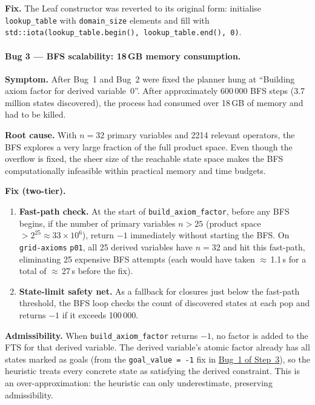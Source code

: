 \documentclass[11pt,a4paper]{article}
\begin{document}
\begin{itemize}
    \textbf{Fix.}  The Leaf constructor was reverted to its original form:
    initialise \texttt{lookup\_table} with \texttt{domain\_size} elements and
    fill with \texttt{std::iota(lookup\_table.begin(), lookup\_table.end(), 0)}.

    \paragraph{Bug 3 --- BFS scalability: 18\,GB memory consumption.}
    \textbf{Symptom.}  After Bug~1 and Bug~2 were fixed the planner hung at
    ``Building axiom factor for derived variable~0''.  After approximately
    600\,000 BFS steps (3.7 million states discovered), the process had
    consumed over 18\,GB of memory and had to be killed.

    \textbf{Root cause.}  With $n = 32$ primary variables and 2214 relevant
    operators, the BFS explores a very large fraction of the full product space.
    Even though the overflow is fixed, the sheer size of the reachable state
    space makes the BFS computationally infeasible within practical memory and
    time budgets.

    \textbf{Fix (two-tier).}
    \begin{enumerate}
      \item \textbf{Fast-path check.}  At the start of
        \texttt{build\_axiom\_factor}, before any BFS begins, if the number
        of primary variables $n > 25$ (product space $> 2^{25} \approx
        33 \times 10^6$), return $-1$ immediately without starting the BFS.
        On \texttt{grid-axioms} \texttt{p01}, all 25 derived variables have
        $n = 32$ and hit this fast-path, eliminating 25 expensive BFS attempts
        (each would have taken $\approx$\,1.1\,s for a total of $\approx$\,27\,s
        before the fix).
      \item \textbf{State-limit safety net.}  As a fallback for closures just
        below the fast-path threshold, the BFS loop checks the count of
        discovered states at each pop and returns $-1$ if it exceeds 100\,000.
    \end{enumerate}

    \textbf{Admissibility.}  When \texttt{build\_axiom\_factor} returns $-1$,
    no factor is added to the FTS for that derived variable.  The derived
    variable's atomic factor already has all states marked as goals (from the
    \texttt{goal\_value = -1} fix in \hyperlink{par:step3-bug1}{Bug~1 of Step~3}), so the heuristic treats
    every concrete state as satisfying the derived constraint.  This is an
    over-approximation: the heuristic can only underestimate, preserving
    admissibility.


\end{itemize}
\end{document}
